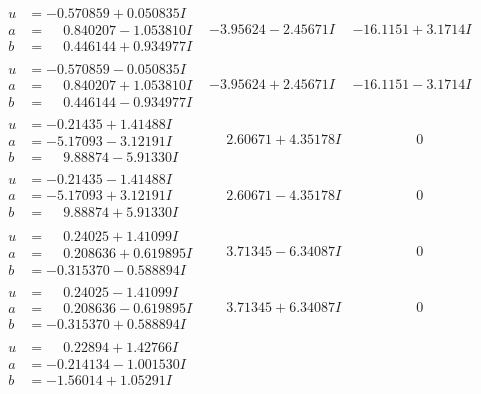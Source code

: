 \documentclass[1p]{elsarticle_modified}
\theoremstyle{definition}
\begin{document}
$$\begin{array}{c|c|c}
\begin{aligned}
u &= -0.570859 + 0.050835 I \\
a &= \phantom{-}0.840207 - 1.053810 I \\
b &= \phantom{-}0.446144 + 0.934977 I\end{aligned}
 & -3.95624 - 2.45671 I & -16.1151 + 3.1714 I \\ \hline\begin{aligned}
u &= -0.570859 - 0.050835 I \\
a &= \phantom{-}0.840207 + 1.053810 I \\
b &= \phantom{-}0.446144 - 0.934977 I\end{aligned}
 & -3.95624 + 2.45671 I & -16.1151 - 3.1714 I \\ \hline\begin{aligned}
u &= -0.21435 + 1.41488 I \\
a &= -5.17093 - 3.12191 I \\
b &= \phantom{-}9.88874 - 5.91330 I\end{aligned}
 & \phantom{-}2.60671 + 4.35178 I & \phantom{-0.000000 } 0 \\ \hline\begin{aligned}
u &= -0.21435 - 1.41488 I \\
a &= -5.17093 + 3.12191 I \\
b &= \phantom{-}9.88874 + 5.91330 I\end{aligned}
 & \phantom{-}2.60671 - 4.35178 I & \phantom{-0.000000 } 0 \\ \hline\begin{aligned}
u &= \phantom{-}0.24025 + 1.41099 I \\
a &= \phantom{-}0.208636 + 0.619895 I \\
b &= -0.315370 - 0.588894 I\end{aligned}
 & \phantom{-}3.71345 - 6.34087 I & \phantom{-0.000000 } 0 \\ \hline\begin{aligned}
u &= \phantom{-}0.24025 - 1.41099 I \\
a &= \phantom{-}0.208636 - 0.619895 I \\
b &= -0.315370 + 0.588894 I\end{aligned}
 & \phantom{-}3.71345 + 6.34087 I & \phantom{-0.000000 } 0 \\ \hline\begin{aligned}
u &= \phantom{-}0.22894 + 1.42766 I \\
a &= -0.214134 - 1.001530 I \\
b &= -1.56014 + 1.05291 I\end{aligned}

\end{array}$$
\end{document}
